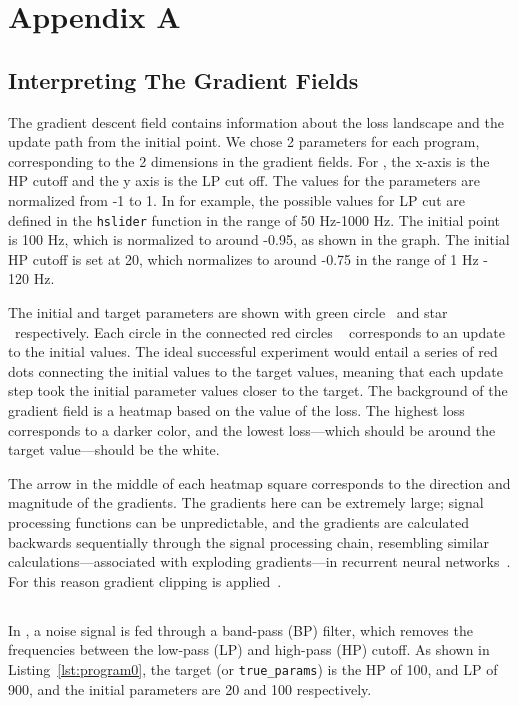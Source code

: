\appendix

\section{Appendix A}


\label{appendix:gradient_fields}
\subsection{Interpreting The Gradient Fields}
\label{sec:interpret_gradient_fields}
The gradient descent field contains information about the loss landscape and the update path from the initial point. We chose 2 parameters for each program, corresponding to the 2 dimensions in the gradient fields. For \BPNoise, the x-axis is the HP cutoff and the y axis is the LP cut off. The values for the parameters are normalized from -1 to 1. In \BPNoise{} for example, the possible values for LP cut are defined in the \texttt{hslider} function in the range of 50 Hz-1000 Hz. The initial point is 100 Hz, which is normalized to around -0.95, as shown in the graph. The initial HP cutoff is set at 20, which normalizes to around -0.75 in the range of 1 Hz - 120 Hz.

The initial and target parameters are shown with green circle \greencircle~and star \greenstar~respectively. Each circle in the connected red circles \redcircles~ corresponds to an update to the initial values. The ideal successful experiment would entail a series of red dots connecting the initial values to the target values, meaning that each update step took the initial parameter values closer to the target. The background of the gradient field is a heatmap based on the value of the loss. The highest loss corresponds to a darker color, and the lowest loss---which should be around the target value---should be the white. 

The arrow in the middle of each heatmap square corresponds to the direction and magnitude of the gradients. The gradients here can be extremely large; signal processing functions can be unpredictable, and the gradients are calculated backwards sequentially through the signal processing chain, resembling similar calculations---associated with exploding gradients---in recurrent neural networks~\cite{gers2000learning}. For this reason gradient clipping is applied~\cite{goodfellow2016deep}.


\subsection{\BPNoise}
In \BPNoise, a noise signal is fed through a band-pass (BP) filter, which removes the frequencies between the low-pass (LP) and high-pass (HP) cutoff. As shown in Listing~\ref{lst:program0}, the target (or \texttt{true\_params}) is the HP of 100, and LP of 900, and the initial parameters are 20 and 100 respectively. 

